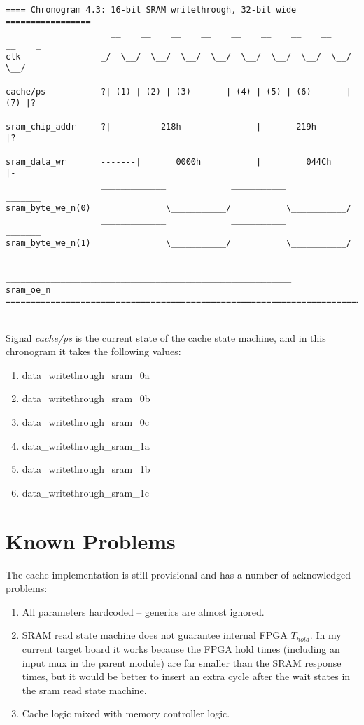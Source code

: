 \begin{verbatim}
==== Chronogram 4.3: 16-bit SRAM writethrough, 32-bit wide =================
                     __    __    __    __    __    __    __    __    __    _
clk                _/  \__/  \__/  \__/  \__/  \__/  \__/  \__/  \__/  \__/ 

cache/ps           ?| (1) | (2) | (3)       | (4) | (5) | (6)       | (7) |?

sram_chip_addr     ?|          218h               |       219h            |?

sram_data_wr       -------|       0000h           |         044Ch         |-
                   _____________             ___________             _______
sram_byte_we_n(0)               \___________/           \___________/
                   _____________             ___________             _______
sram_byte_we_n(1)               \___________/           \___________/

                   _________________________________________________________
sram_oe_n          
============================================================================
\end{verbatim}\\

Signal \emph{cache/ps} is the current state of the cache state machine, and
in this chronogram it takes the following values:

\begin{enumerate}
\item data\_writethrough\_sram\_0a
\item data\_writethrough\_sram\_0b
\item data\_writethrough\_sram\_0c
\item data\_writethrough\_sram\_1a
\item data\_writethrough\_sram\_1b
\item data\_writethrough\_sram\_1c
\end{enumerate}

   

\section{Known Problems}
\label{cache_problems}

    The cache implementation is still provisional and has a number of 
    acknowledged problems:

\begin{enumerate}
\item All parameters hardcoded -- generics are almost ignored.
\item SRAM read state machine does not guarantee internal FPGA $T_{hold}$. 
        In my current target board it works because the FPGA hold times 
        (including an input mux
        in the parent module) are far smaller than the SRAM response times, but
        it would be better to insert an extra cycle after the wait states in
        the sram read state machine.
\item Cache logic mixed with memory controller logic.
\end{enumerate}

